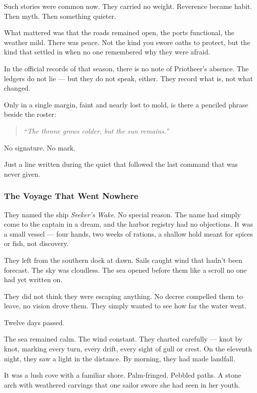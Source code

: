 \documentclass[12pt]{article}
\begin{document}
Such stories were common now. They carried no weight. Reverence became habit. Then myth. Then something quieter.

What mattered was that the roads remained open, the ports functional, the weather mild. There was peace. Not the kind you swore oaths to protect, but the kind that settled in when no one remembered why they were afraid.

In the official records of that season, there is no note of Priotheer’s absence. The ledgers do not lie — but they do not speak, either. They record what is, not what changed.

Only in a single margin, faint and nearly lost to mold, is there a penciled phrase beside the roster:

\begin{quote}
\emph{“The throne grows colder, but the sun remains.”}
\end{quote}

No signature. No mark.

Just a line written during the quiet that followed the last command that was never given.

\dotfill

\subsubsection*{The Voyage That Went Nowhere}

They named the ship \emph{Seeker’s Wake}. No special reason. The name had simply come to the captain in a dream, and the harbor registry had no objections. It was a small vessel — four hands, two weeks of rations, a shallow hold meant for spices or fish, not discovery.

They left from the southern dock at dawn. Sails caught wind that hadn’t been forecast. The sky was cloudless. The sea opened before them like a scroll no one had yet written on.

They did not think they were escaping anything. No decree compelled them to leave, no vision drove them. They simply wanted to see how far the water went.

Twelve days passed.

The sea remained calm. The wind constant. They charted carefully — knot by knot, marking every turn, every drift, every sight of gull or crest. On the eleventh night, they saw a light in the distance. By morning, they had made landfall.

It was a lush cove with a familiar shore. Palm-fringed. Pebbled paths. A stone arch with weathered carvings that one sailor swore she had seen in her youth.
\end{document}
